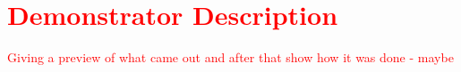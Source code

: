 \chapter{\textcolor{red}{ Demonstrator Description}}
\textcolor{red}{Giving a preview of what came out and after that show how it was done - maybe}